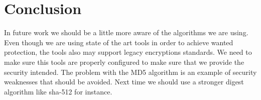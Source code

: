 \section {Conclusion} %

In future work we should be a little more aware of the algorithms we are using. Even though we are using state of the art tools in order to achieve wanted protection, the tools also may support legacy encryptions standards. We need to make sure this tools are properly configured to make sure that we provide the security intended. The problem with the MD5 algorithm is an example of security weaknesses that should be avoided. Next time we should use a stronger digest algorithm like sha-512 for instance. 

